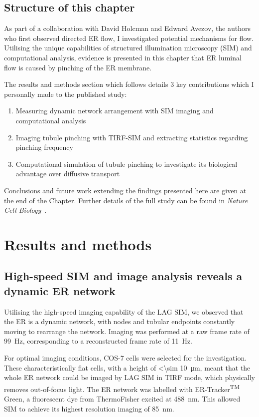 \subsection{Structure of this chapter}
As part of a collaboration with David Holcman and Edward Avezov, the authors who first observed directed ER flow, I investigated potential mechanisms for flow. 
Utilising the unique capabilities of structured illumination microscopy (SIM) and computational analysis, evidence is presented in this chapter that ER luminal flow is caused by pinching of the ER membrane.

The results and methods section which follows details 3 key contributions which I personally made to the published study:
\begin{enumerate}
	\item Measuring dynamic network arrangement with SIM imaging and computational analysis
	\item Imaging tubule pinching with TIRF-SIM and extracting statistics regarding pinching frequency
	\item Computational simulation of tubule pinching to investigate its biological advantage over diffusive transport
\end{enumerate}

Conclusions and future work extending the findings presented here are given at the end of the Chapter. 
Further details of the full study can be found in \textit{Nature Cell Biology}~\cite{holcman2018single}. 

\section{Results and methods} \label{sec:ERresults}
\subsection{High-speed SIM and image analysis reveals a dynamic ER network} \label{sec:ERnetwork}
Utilising the high-speed imaging capability of the LAG SIM, we  observed that the ER is a dynamic network, with nodes and tubular endpoints constantly moving to rearrange the network. 
Imaging was performed at a raw frame rate of \SI{99}{\hertz}, corresponding to a reconstructed frame rate of \SI{11}{\hertz}. 

For optimal imaging conditions, COS-7 cells were selected for the investigation. 
These characteristically flat cells, with a height of <\SI{\sim 10}{\micro\meter}, %
meant that the whole ER network could be imaged by LAG SIM in TIRF mode, which physically removes out-of-focus light. 
The ER network was labelled with ER-Tracker\textsuperscript{TM} Green, a fluorescent dye from ThermoFisher excited at \SI{488}{\nano\meter}. 
This allowed SIM to achieve its highest resolution imaging of \SI{85}{\nano\meter}. 

